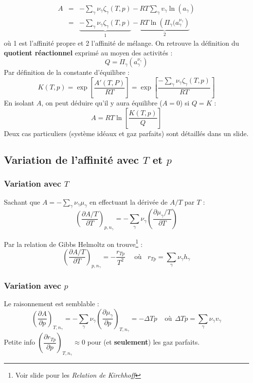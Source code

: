 \documentclass[british,french,11pt, a4paper, openany]{book}
\begin{document}
	\begin{eqnarray}
	A &=& - \sum_\gamma \nu_\gamma\zeta_\gamma(T,p) - RT\sum_\gamma v_\gamma \ln(a_\gamma)\\
	&=& \underbrace{-\sum_\gamma \nu_\gamma\zeta_\gamma(T,p)}_1 -\underbrace{RT\ln\left(\Pi_\gamma(a_\gamma^{\nu_\gamma}\right)}_2
	\end{eqnarray}
	où 1 est l'affinité propre et 2 l'affinité de mélange. On retrouve la définition du \textbf{quotient réactionnel} exprimé au moyen des activités : 
	\begin{equation}
	Q = \Pi_\gamma \left(a_\gamma^{\nu_\gamma}\right)
	\end{equation}
	Par définition de la constante d'équilibre : 
	\begin{equation}
	K(T,p) = \exp\left[\dfrac{A'(T,P)}{RT}\right] = \exp\left[\dfrac{-\sum_\gamma  \nu_\gamma \zeta_\gamma(T,p) }{RT} \right]
	\end{equation} 
	En isolant $A$, on peut déduire qu'il y aura équilibre ($A = 0$) si $Q = K$ :
	\begin{equation}
	A = RT \ln\left[\frac{K(T,p)}{Q} \right]
	\end{equation}
	Deux cas particuliers (système idéaux et gaz parfaits) sont détaillés dans un slide.
	
	\subsection{Variation de l'affinité avec $T$ et $p$}
	\subsubsection{Variation avec $T$}
	Sachant que $A = -\sum_\gamma \nu_\gamma \mu_\gamma$ en effectuant la dérivée de $A/T$ par $T$ :
	\begin{equation}
	\left(\frac{\partial A/T}{\partial T}\right)_{p,n_\gamma} = - \sum_\gamma \nu_\gamma \left(\dfrac{\partial \mu_\gamma / T}{\partial T}\right)
	\end{equation}
	
	Par la relation de Gibbs Helmoltz on trouve\footnote{Voir slide pour les \textit{Relation de Kirchhoff}} :
	\begin{equation}
	\left(\frac{\partial A/T}{\partial T}\right)_{p,n_\gamma} = -\dfrac{r_{Tp}}{T^2}\ \ \ \ \ \ \text{où}\  \ \ \ r_{Tp} = \sum_\gamma \nu_\gamma h_\gamma
	\end{equation}
	
	\subsubsection{Variation avec $p$}
	Le raisonnement est semblable :
	\begin{equation}
	\left(\dfrac{\partial A}{\partial p}\right)_{T, n_\gamma} = - \sum_\gamma \nu_\gamma \left(\dfrac{\partial \mu_\gamma}{\partial p}\right)_{T, n_\gamma} = -\Delta Tp\ \ \ \ \ \text{où}\ \ \Delta Tp = \sum_\gamma \nu_\gamma v_\gamma
	\end{equation}
	Petite info $\left(\dfrac{\partial r_{Tp}}{\partial p}\right)_{T, n_\gamma} \approx 0$ pour (et \textbf{seulement}) les gaz parfaits.\\
	
\end{document}
